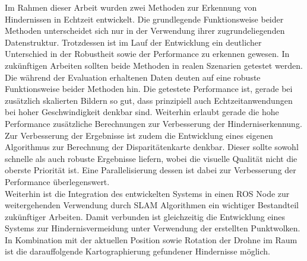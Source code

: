 Im Rahmen dieser Arbeit wurden zwei Methoden zur Erkennung von Hindernissen in Echtzeit entwickelt. Die grundlegende Funktionsweise beider Methoden unterscheidet sich nur in der Verwendung ihrer zugrundeliegenden Datenstruktur. Trotzdessen ist im Lauf der Entwicklung ein deutlicher Unterschied in der Robustheit sowie der Performance zu erkennen gewesen. In zukünftigen Arbeiten sollten beide Methoden in realen Szenarien getestet werden.\\

\noindent
Die während der Evaluation erhaltenen Daten deuten auf eine robuste Funktionsweise beider Methoden hin. Die getestete Performance ist, gerade bei zusätzlich skalierten Bildern so gut, dass prinzipiell auch Echtzeitanwendungen bei hoher Geschwindigkeit denkbar sind. Weiterhin erlaubt gerade die hohe Performance zusätzliche Berechnungen zur Verbesserung der Hinderniserkennung.\\

\noindent
Zur Verbesserung der Ergebnisse ist zudem die Entwicklung eines eigenen Algorithmus zur Berechnung der Disparitätenkarte denkbar. Dieser sollte sowohl schnelle als auch robuste Ergebnisse liefern, wobei die visuelle Qualität nicht die oberste Priorität ist. Eine Parallelisierung dessen ist dabei zur Verbesserung der Performance überlegenswert.\\

\noindent
Weiterhin ist die Integration des entwickelten Systems in einen ROS Node zur weitergehenden Verwendung durch SLAM Algorithmen ein wichtiger Bestandteil zukünftiger Arbeiten. Damit verbunden ist gleichzeitig die Entwicklung eines Systems zur Hindernisvermeidung unter Verwendung der erstellten Punktwolken. In Kombination mit der aktuellen Position sowie Rotation der Drohne im Raum ist die darauffolgende Kartographierung gefundener Hindernisse möglich.\\

\noindent





